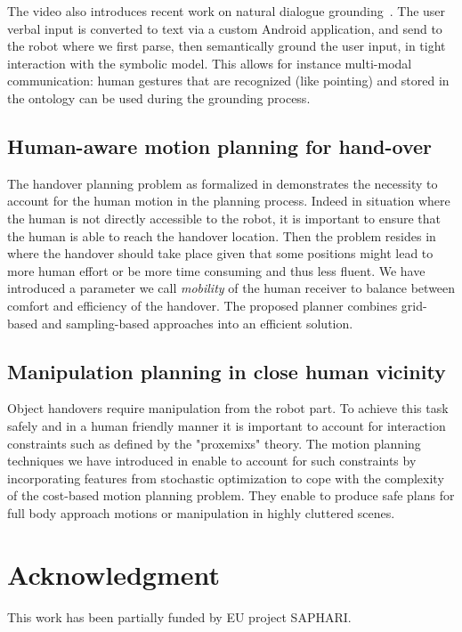 \documentclass[conference]{IEEEtran}
\begin{document}
The video also introduces recent work on natural dialogue
grounding~\cite{Lemaignan2011a}. The user verbal input is converted to text via
a custom Android application, and send to the robot where we first parse, then
semantically ground the user input, in tight interaction with the symbolic
model. This allows for instance multi-modal communication: human gestures that
are recognized (like pointing) and stored in the ontology can be used during
the grounding process.

\subsection{Human-aware motion planning for hand-over}

The handover planning problem as formalized in \cite{Mainprice:12} demonstrates the necessity to account for the human motion in the planning process. Indeed in situation where the human is not directly accessible to the robot, it is important to ensure that the human is able to reach the handover location. Then the problem resides in where the handover should take place given that some positions might lead to more human effort or be more time consuming and thus less fluent. We have introduced a parameter we call \textit{mobility} of the human receiver to balance between comfort and efficiency of the handover. The proposed planner combines grid-based and sampling-based approaches into an efficient solution.

\subsection{Manipulation planning in close human vicinity}

Object handovers require manipulation from the robot part. To achieve this task safely and in a human friendly manner it is important to account for interaction constraints such as defined by the "proxemixs" theory. The motion planning techniques we have introduced in \cite{Mainprice:11}  enable to account for such constraints by incorporating features from stochastic optimization to cope with the complexity of the cost-based motion planning problem. They enable to produce safe plans for full body approach motions or manipulation in highly cluttered scenes.

\section*{Acknowledgment}

This work has been partially funded by EU project SAPHARI.




\end{document}
